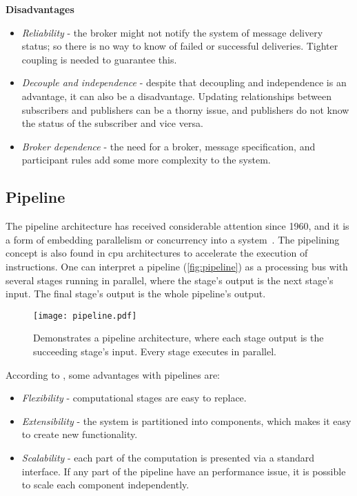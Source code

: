 \textbf{Disadvantages}
\begin{itemize}
    \item \emph{Reliability} -  the broker might not notify the system of message delivery status; so there is no way to know of failed or successful deliveries. Tighter coupling is needed to guarantee this.
    
    \item \emph{Decouple and independence} - despite that decoupling and independence is an advantage, it can also be a disadvantage. Updating relationships between subscribers and publishers can be a thorny issue, and publishers do not know the status of the subscriber and vice versa.
    
    \item \emph{Broker dependence} - the need for a broker, message specification, and participant rules add some more complexity to the system.
\end{itemize}

\newpage
\subsection{Pipeline}
The pipeline architecture has received considerable attention since 1960, and it is a form of embedding parallelism or concurrency into a system~\cite{ramamoorthy1977pipeline}. The pipelining concept is also found in \ac{cpu} architectures to accelerate the execution of instructions. One can interpret a pipeline (\autoref{fig:pipeline}) as a processing bus with several stages running in parallel, where the stage's output is the next stage's input. The final stage's output is the whole pipeline's output.

\begin{figure}[ht]
    \centering
    \texttt{[image: pipeline.pdf]}
    \caption[Architecture - Pipeline]{Demonstrates a pipeline architecture, where each stage output is the succeeding stage's input. Every stage executes in parallel.}
    \label{fig:pipeline}
\end{figure}

According to \cite{ml_pipeline_1}, some advantages with pipelines are:

\begin{itemize}
    \item \emph{Flexibility} - computational stages are easy to replace. 
    \item \emph{Extensibility} - the system is partitioned into components, which makes it easy to create new functionality.
    \item \emph{Scalability} - each part of the computation is presented via a standard interface. If any part of the pipeline have an performance issue, it is possible to scale each component independently.
\end{itemize}

